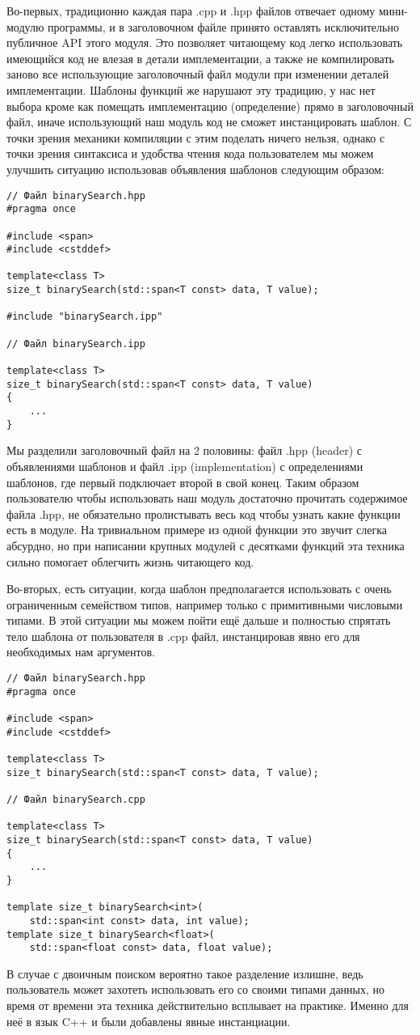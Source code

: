 Во-первых, традиционно каждая пара .cpp и .hpp файлов отвечает одному мини-модулю программы, и в заголовочном файле принято оставлять исключительно публичное API этого модуля. Это позволяет читающему код легко использовать имеющийся код не влезая в детали имплементации, а также не компилировать заново все использующие заголовочный файл модули при изменении деталей имплементации. Шаблоны функций же нарушают эту традицию, у нас нет выбора кроме как помещать имплементацию (определение) прямо в заголовочный файл, иначе использующий наш модуль код не сможет инстанцировать шаблон. С точки зрения механики компиляции с этим поделать ничего нельзя, однако с точки зрения синтаксиса и удобства чтения кода пользователем мы можем улучшить ситуацию использовав объявления шаблонов следующим образом:
\begin{verbatim}
// Файл binarySearch.hpp
#pragma once

#include <span>
#include <cstddef>

template<class T>
size_t binarySearch(std::span<T const> data, T value);

#include "binarySearch.ipp"

// Файл binarySearch.ipp

template<class T>
size_t binarySearch(std::span<T const> data, T value)
{
    ...
}
\end{verbatim}
Мы разделили заголовочный файл на 2 половины: файл .hpp (header) с объявлениями шаблонов и файл .ipp (implementation) с определениями шаблонов, где первый подключает второй в свой конец. Таким образом пользователю чтобы использовать наш модуль достаточно прочитать содержимое файла .hpp, не обязательно пролистывать весь код чтобы узнать какие функции есть в модуле. На тривиальном примере из одной функции это звучит слегка абсурдно, но при написании крупных модулей с десятками функций эта техника сильно помогает облегчить жизнь читающего код.

Во-вторых, есть ситуации, когда шаблон предполагается использовать с очень ограниченным семейством типов, например только с примитивными числовыми типами. В этой ситуации мы можем пойти ещё дальше и полностью спрятать тело шаблона от пользователя в .cpp файл, инстанцировав явно его для необходимых нам аргументов.
\begin{verbatim}
// Файл binarySearch.hpp
#pragma once

#include <span>
#include <cstddef>

template<class T>
size_t binarySearch(std::span<T const> data, T value);

// Файл binarySearch.cpp

template<class T>
size_t binarySearch(std::span<T const> data, T value)
{
    ...
}

template size_t binarySearch<int>(
    std::span<int const> data, int value);
template size_t binarySearch<float>(
    std::span<float const> data, float value);
\end{verbatim}
В случае с двоичным поиском вероятно такое разделение излишне, ведь пользователь может захотеть использовать его со своими типами данных, но время от времени эта техника действительно всплывает на практике. Именно для неё в язык C++ и были добавлены явные инстанциации.

